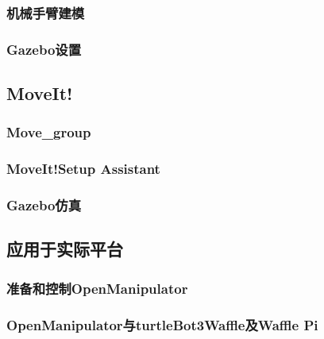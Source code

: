 \documentclass[geye,green,kindle,cn]{elegantnote}
\begin{document}
\subsubsection{机械手臂建模}
\subsubsection{Gazebo设置}
\subsection{MoveIt!}
\subsubsection{Move\_group}
\subsubsection{MoveIt!Setup Assistant}
\subsubsection{Gazebo仿真}
\subsection{应用于实际平台}
\subsubsection{准备和控制OpenManipulator}
\subsubsection{OpenManipulator与turtleBot3Waffle及Waffle Pi}
\end{document}
